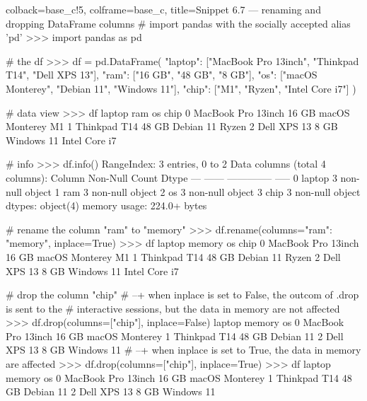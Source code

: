 \documentclass[a4paper,11pt]{book}
\numberwithin{figure}{chapter}
\numberwithin{table}{chapter}
\begin{document}
\begin{pythoncode}[linenos=True]{colback=base_c!5, colframe=base_c, title=\sffamily Snippet 6.7 --- renaming and dropping DataFrame columns}
# import pandas with the socially accepted alias 'pd'
>>> import pandas as pd

# the df 
>>> df = pd.DataFrame(
	{
	    "laptop": ["MacBook Pro 13inch", "Thinkpad T14", "Dell XPS 13"],
	    "ram": ["16 GB", "48 GB", "8 GB"],
	    "os": ["macOS Monterey", "Debian 11", "Windows 11"],
	    "chip": ["M1", "Ryzen", "Intel Core i7"]
	}
    )

# data view
>>> df
               laptop    ram              os           chip
0  MacBook Pro 13inch  16 GB  macOS Monterey             M1
1        Thinkpad T14  48 GB       Debian 11          Ryzen
2         Dell XPS 13   8 GB      Windows 11  Intel Core i7 

# info
>>> df.info()
RangeIndex: 3 entries, 0 to 2
Data columns (total 4 columns):
     Column  Non-Null Count  Dtype 
---  ------  --------------  ----- 
 0   laptop  3 non-null      object
 1   ram     3 non-null      object
 2   os      3 non-null      object
 3   chip    3 non-null      object
dtypes: object(4)
memory usage: 224.0+ bytes

# rename the column "ram" to "memory"
>>> df.rename(columns={"ram": "memory"}, inplace=True)
>>> df
               laptop memory              os           chip
0  MacBook Pro 13inch  16 GB  macOS Monterey             M1
1        Thinkpad T14  48 GB       Debian 11          Ryzen
2         Dell XPS 13   8 GB      Windows 11  Intel Core i7

# drop the column "chip"
# --+ when inplace is set to False, the outcom of .drop is sent to the 
# interactive sessions, but the data in memory are not affected
>>> df.drop(columns=["chip"], inplace=False)
               laptop memory              os
0  MacBook Pro 13inch  16 GB  macOS Monterey
1        Thinkpad T14  48 GB       Debian 11
2         Dell XPS 13   8 GB      Windows 11
# --+ when inplace is set to True, the data in memory are affected
>>> df.drop(columns=["chip"], inplace=True)
>>> df
               laptop memory              os
0  MacBook Pro 13inch  16 GB  macOS Monterey
1        Thinkpad T14  48 GB       Debian 11
2         Dell XPS 13   8 GB      Windows 11

\end{pythoncode}
\end{document}

